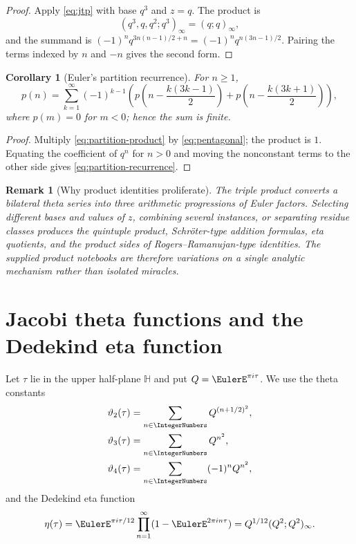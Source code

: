 \documentclass[11pt]{article}
\theoremstyle{blueplain}
\newtheorem{corollary}[theorem]{Corollary}
\theoremstyle{bluedef}
\newtheorem{remark}[theorem]{Remark}
\begin{document}
\begin{proof}
Apply \eqref{eq:jtp} with base $q^3$ and $z=q$.  The product is
\[
(q^3,q,q^2;q^3)_\infty=(q;q)_\infty,
\]
and the summand is $(-1)^nq^{3n(n-1)/2+n}=(-1)^nq^{n(3n-1)/2}$.  Pairing the terms indexed by $n$ and $-n$ gives the second form.
\end{proof}

\begin{corollary}[Euler's partition recurrence]\label{cor:partition-recurrence}
For $n\ge1$,
\begin{equation}\label{eq:partition-recurrence}
p(n)=\sum_{k=1}^{\infty}(-1)^{k-1}
\left(
 p\!\left(n-\frac{k(3k-1)}2\right)
+p\!\left(n-\frac{k(3k+1)}2\right)
\right),
\end{equation}
where $p(m)=0$ for $m<0$; hence the sum is finite.
\end{corollary}

\begin{proof}
Multiply \eqref{eq:partition-product} by \eqref{eq:pentagonal}; the product is $1$.  Equating the coefficient of $q^n$ for $n>0$ and moving the nonconstant terms to the other side gives \eqref{eq:partition-recurrence}.
\end{proof}

\begin{remark}[Why product identities proliferate]
The triple product converts a bilateral theta series into three arithmetic progressions of Euler factors.  Selecting different bases and values of $z$, combining several instances, or separating residue classes produces the quintuple product, Schr\"oter-type addition formulas, eta quotients, and the product sides of Rogers--Ramanujan-type identities.  The supplied product notebooks are therefore variations on a single analytic mechanism rather than isolated miracles.
\end{remark}

\section{Jacobi theta functions and the Dedekind eta function}

Let $\tau$ lie in the upper half-plane $\mathbb H$ and put $Q=\EulerE^{\pi i\tau}$.  We use the theta constants
\begin{align*}
\vartheta_2(\tau)&=\sum_{n\in\IntegerNumbers}Q^{(n+1/2)^2},\\
\vartheta_3(\tau)&=\sum_{n\in\IntegerNumbers}Q^{n^2},\\
\vartheta_4(\tau)&=\sum_{n\in\IntegerNumbers}(-1)^nQ^{n^2},
\end{align*}
and the Dedekind eta function
\begin{equation}\label{eq:eta-def}
\eta(\tau)=\EulerE^{\pi i\tau/12}\prod_{n=1}^{\infty}(1-\EulerE^{2\pi in\tau})
=Q^{1/12}(Q^2;Q^2)_\infty.
\end{equation}
\end{document}
